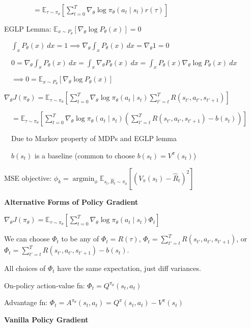 \documentclass[twocolumn]{article}
\DeclareMathOperator*{\argmin}{argmin}
\begin{document}
$\hspace{4em} = \mathbb E_{\tau \sim \pi_\theta} \left[ \sum_{t=0}^T \nabla_\theta \log \pi_\theta (a_t \mid s_t) r(\tau) \right]$

\dotfill

EGLP Lemma: $\mathbb E_{x \sim P_\theta} [\nabla_\theta \log P_\theta(x)] = 0$

$\quad \int_x P_\theta(x)\ dx = 1 \implies \nabla_\theta \int_x P_\theta(x)\ dx = \nabla_\theta 1 = 0$

$\quad 0 = \nabla_\theta \int_x P_\theta(x)\ dx = \int_x \nabla_\theta P_\theta(x)\ dx = \int_x P_\theta(x) \nabla_\theta \log P_\theta(x)\ dx$

$\quad \implies 0 = \mathbb E_{x \sim P_\theta}[\nabla_\theta \log P_\theta(x)]$

$\nabla_\theta J(\pi_\theta) = \mathbb E_{\tau \sim \pi_\theta} \left[ \sum_{t=0}^T \nabla_\theta \log \pi_\theta(a_t \mid s_t) \sum_{t'=t}^T R(s_{t'}, a_{t'}, s_{t'+1}) \right]$

$\quad = \mathbb E_{\tau \sim \pi_\theta} \left[ \sum_{t=0}^T \nabla_\theta \log \pi_\theta(a_t \mid s_t) \left( \sum_{t'=t}^T R(s_{t'}, a_{t'}, s_{t'+1}) - b(s_t) \right) \right]$

$\quad$Due to Markov property of MDPs and EGLP lemma

$\quad b(s_t)$ is a baseline (common to choose $b(s_t) = V^\pi(s_t)$)

MSE objective: $\phi_k = \argmin_\phi \mathbb E_{s_t, \hat R_t \sim \pi_k} \left[ \left(V_\pi(s_t) - \hat R_t \right)^2 \right]$

\dotfill

\textbf{Alternative Forms of Policy Gradient}

$\nabla_\theta J(\pi_\theta) = \mathbb E_{\tau \sim \pi_\theta} \left[ \sum_{t=0}^T \nabla_\theta \log \pi_\theta(a_t \mid s_t) \Phi_t \right]$

We can choose $\Phi_t$ to be any of $\Phi_t = R(\tau)$, \hfill $\Phi_t = \sum_{t'=t}^T R(s_{t'}, a_{t'}, s_{t'+1})$, or $\Phi_t = \sum_{t'=t}^T R(s_{t'}, a_{t'}, s_{t'+1}) - b(s_t)$.

All choices of $\Phi_t$ have the same expectation, just diff variances.

On-policy action-value fn: $\Phi_t = Q^{\pi_\theta}(s_t, a_t)$

Advantage fn: $\Phi_t = A^{\pi_\theta} (s_t, a_t) = Q^\pi(s_t, a_t) - V^\pi(s_t)$

\dotfill

\textbf{Vanilla Policy Gradient}
\end{document}
